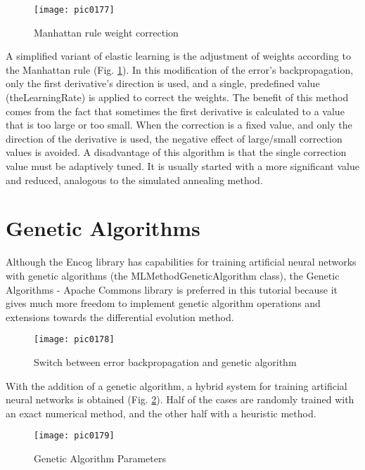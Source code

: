\begin{figure}[h]
\centering
\texttt{[image: pic0177]}
\caption{Manhattan rule weight correction}
\label{fig:pic0177}
\end{figure}
\FloatBarrier

A simplified variant of elastic learning is the adjustment of weights according to the Manhattan rule (Fig. \ref{fig:pic0177}). In this modification of the error's backpropagation, only the first derivative's direction is used, and a single, predefined value (theLearningRate) is applied to correct the weights. The benefit of this method comes from the fact that sometimes the first derivative is calculated to a value that is too large or too small. When the correction is a fixed value, and only the direction of the derivative is used, the negative effect of large/small correction values is avoided. A disadvantage of this algorithm is that the single correction value must be adaptively tuned. It is usually started with a more significant value and reduced, analogous to the simulated annealing method.

\section{Genetic Algorithms}

Although the Encog library has capabilities for training artificial neural networks with genetic algorithms (the MLMethodGeneticAlgorithm class), the Genetic Algorithms - Apache Commons library is preferred in this tutorial because it gives much more freedom to implement genetic algorithm operations and extensions towards the differential evolution method.

\begin{figure}[h]
\centering
\texttt{[image: pic0178]}
\caption{Switch between error backpropagation and genetic algorithm}
\label{fig:pic0178}
\end{figure}
\FloatBarrier

With the addition of a genetic algorithm, a hybrid system for training artificial neural networks is obtained (Fig. \ref{fig:pic0178}). Half of the cases are randomly trained with an exact numerical method, and the other half with a heuristic method.

\begin{figure}[h]
\centering
\texttt{[image: pic0179]}
\caption{Genetic Algorithm Parameters}
\label{fig:pic0179}
\end{figure}
\FloatBarrier

